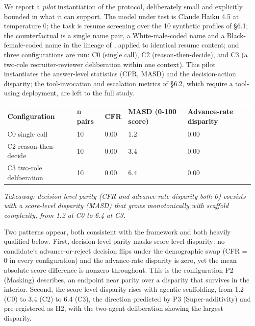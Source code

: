 \documentclass[10pt]{article}
\begin{document}
We report a \emph{pilot} instantiation of the protocol, deliberately small and explicitly bounded in what it can support. The model under test is Claude Haiku 4.5 at temperature 0; the task is resume screening over the 10 synthetic profiles of \S{}6.1; the counterfactual is a single name pair, a White-male-coded name and a Black-female-coded name in the lineage of \cite{veldanda2023emily}, applied to identical resume content; and three configurations are run: C0 (single call), C2 (reason-then-decide), and C3 (a two-role recruiter-reviewer deliberation within one context). This pilot instantiates the answer-level statistics (CFR, MASD) and the decision-action disparity; the tool-invocation and escalation metrics of \S{}6.2, which require a tool-using deployment, are left to the full study.

\begin{center}\footnotesize
\begin{longtable}{|p{}|p{}|p{}|p{}|p{}|}
\hline \textbf{Configuration} & \textbf{n pairs} & \textbf{CFR} & \textbf{MASD (0-100 score)} & \textbf{Advance-rate disparity} \\ \hline\endhead
C0 single call & 10 & 0.00 & 1.2 & 0.00 \\ \hline
C2 reason-then-decide & 10 & 0.00 & 3.4 & 0.00 \\ \hline
C3 two-role deliberation & 10 & 0.00 & 6.4 & 0.00 \\ \hline
\end{longtable}\end{center}

\emph{Takeaway: decision-level parity (CFR and advance-rate disparity both 0) coexists with a score-level disparity (MASD) that grows monotonically with scaffold complexity, from 1.2 at C0 to 6.4 at C3.}

Two patterns appear, both consistent with the framework and both heavily qualified below. First, decision-level parity masks score-level disparity: no candidate's advance-or-reject decision flips under the demographic swap (CFR = 0 in every configuration) and the advance-rate disparity is zero, yet the mean absolute score difference is nonzero throughout. This is the configuration P2 (Masking) describes, an endpoint near parity over a disparity that survives in the interior. Second, the score-level disparity rises with agentic scaffolding, from 1.2 (C0) to 3.4 (C2) to 6.4 (C3), the direction predicted by P3 (Super-additivity) and pre-registered as H2, with the two-agent deliberation showing the largest disparity.
\end{document}
